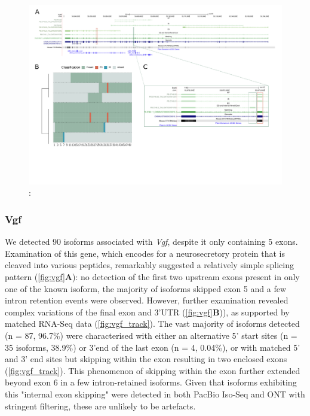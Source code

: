 \begin{landscape}
	\begin{figure}[htp]
		\begin{center}
			\includegraphics[page=10,trim={0 1cm 0 0},scale = 0.85]{Figures/TargetGenes_Annotation_Landscape.pdf}
		\end{center}
		\captionsetup{width=0.95\textwidth}
		\caption[RNA-Seq defined transcriptome]%
		{\textbf{}: }   
		\label{fig:sorl1}
	\end{figure}
\end{landscape}   

\newpage
\subsubsection{Vgf}
We detected 90 isoforms associated with \textit{Vgf}, despite it only containing 5 exons. Examination of this gene, which encodes for a neurosecretory protein that is cleaved into various peptides, remarkably suggested a relatively simple splicing pattern (\cref{fig:vgf}\textbf{A}): no detection of the first two upstream exons present in only one of the known isoform, the majority of isoforms skipped exon 5 and a few intron retention events were observed. However, further examination revealed complex variations of the final exon and 3'UTR (\cref{fig:vgf}\textbf{B})), as supported by matched RNA-Seq data (\cref{fig:vgf_track}). The vast majority of isoforms detected (n = 87, 96.7\%) were characterised with either an alternative 5' start sites (n = 35 isoforms, 38.9\%) or 3'end of the last exon (n = 4, 0.04\%), or with matched 5' and 3' end sites but skipping within the exon resulting in two enclosed exons (\cref{fig:vgf_track}). This phenomenon of skipping within the exon further extended beyond exon 6 in a few intron-retained isoforms. Given that isoforms exhibiting this "internal exon skipping" were detected in both PacBio Iso-Seq and ONT with stringent filtering, these are unlikely to be artefacts. 

